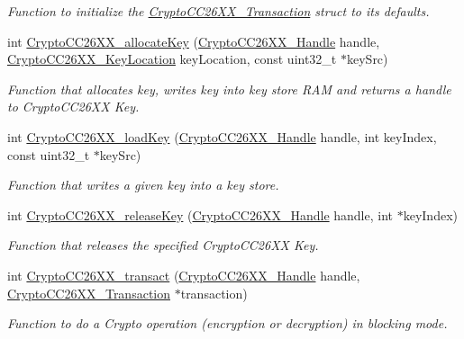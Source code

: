 \begin{DoxyCompactItemize}
\begin{DoxyCompactList}\small\item\em Function to initialize the \hyperlink{struct_crypto_c_c26_x_x___transaction}{Crypto\+C\+C26\+X\+X\+\_\+\+Transaction} struct to its defaults. \end{DoxyCompactList}\item 
int \hyperlink{_crypto_c_c26_x_x_8h_a50d5828043e87fd37398d2aabe9b9e92}{Crypto\+C\+C26\+X\+X\+\_\+allocate\+Key} (\hyperlink{_crypto_c_c26_x_x_8h_a8737c63107a1cb5548ba06f7a48259b5}{Crypto\+C\+C26\+X\+X\+\_\+\+Handle} handle, \hyperlink{_crypto_c_c26_x_x_8h_a5266637af2c4ac36ed58d4e0f158b706}{Crypto\+C\+C26\+X\+X\+\_\+\+Key\+Location} key\+Location, const uint32\+\_\+t $\ast$key\+Src)
\begin{DoxyCompactList}\small\item\em Function that allocates key, writes key into key store R\+A\+M and returns a handle to Crypto\+C\+C26\+X\+X Key. \end{DoxyCompactList}\item 
int \hyperlink{_crypto_c_c26_x_x_8h_a2faba7afcf3ade13881e4f0ece378c63}{Crypto\+C\+C26\+X\+X\+\_\+load\+Key} (\hyperlink{_crypto_c_c26_x_x_8h_a8737c63107a1cb5548ba06f7a48259b5}{Crypto\+C\+C26\+X\+X\+\_\+\+Handle} handle, int key\+Index, const uint32\+\_\+t $\ast$key\+Src)
\begin{DoxyCompactList}\small\item\em Function that writes a given key into a key store. \end{DoxyCompactList}\item 
int \hyperlink{_crypto_c_c26_x_x_8h_aa995ee20d8a7fcce66aeae86fee83555}{Crypto\+C\+C26\+X\+X\+\_\+release\+Key} (\hyperlink{_crypto_c_c26_x_x_8h_a8737c63107a1cb5548ba06f7a48259b5}{Crypto\+C\+C26\+X\+X\+\_\+\+Handle} handle, int $\ast$key\+Index)
\begin{DoxyCompactList}\small\item\em Function that releases the specified Crypto\+C\+C26\+X\+X Key. \end{DoxyCompactList}\item 
int \hyperlink{_crypto_c_c26_x_x_8h_a6864191d34a9a3cfbcd36cc34570b3b8}{Crypto\+C\+C26\+X\+X\+\_\+transact} (\hyperlink{_crypto_c_c26_x_x_8h_a8737c63107a1cb5548ba06f7a48259b5}{Crypto\+C\+C26\+X\+X\+\_\+\+Handle} handle, \hyperlink{struct_crypto_c_c26_x_x___transaction}{Crypto\+C\+C26\+X\+X\+\_\+\+Transaction} $\ast$transaction)
\begin{DoxyCompactList}\small\item\em Function to do a Crypto operation (encryption or decryption) in blocking mode. \end{DoxyCompactList}\item 

\end{DoxyCompactItemize}
